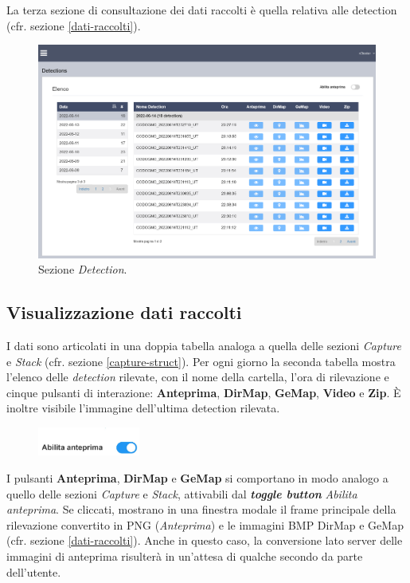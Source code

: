 La terza sezione di consultazione dei dati raccolti è quella relativa alle detection (cfr. sezione \ref{dati-raccolti}).

\begin{figure}[H]
    \begin{center}
    \includegraphics[width=\textwidth]{images/full-detection.png}
    \caption{Sezione \emph{Detection}.}
    \label{fig:detection}
    \end{center}
\end{figure}

\subsection{Visualizzazione dati raccolti} \label{detec-tables}

I dati sono articolati in una doppia tabella analoga a quella delle sezioni \emph{Capture} e \emph{Stack} (cfr. sezione \ref{capture-struct}). Per ogni giorno la seconda tabella mostra l'elenco delle \emph{detection} rilevate, con il nome della cartella, l'ora di rilevazione e cinque pulsanti di interazione: \textbf{Anteprima}, \textbf{DirMap}, \textbf{GeMap}, \textbf{Video} e \textbf{Zip}. È inoltre visibile l'immagine dell'ultima detection rilevata.

\begin{figure}
    \vspace{-30pt}
    \includegraphics[width=0.3\textwidth]{images/toggle-button.jpg}
    \vspace{-30pt}
\end{figure}
I pulsanti \textbf{Anteprima}, \textbf{DirMap} e \textbf{GeMap} si comportano in modo analogo a quello delle sezioni \emph{Capture} e \emph{Stack}, attivabili dal \textbf{\emph{toggle button}} \emph{Abilita anteprima}. Se cliccati, mostrano in una finestra modale il frame principale della rilevazione convertito in PNG (\emph{Anteprima}) e le immagini BMP DirMap e GeMap (cfr. sezione \ref{dati-raccolti}). Anche in questo caso, la conversione lato server delle immagini di anteprima risulterà in un'attesa di qualche secondo da parte dell'utente.


